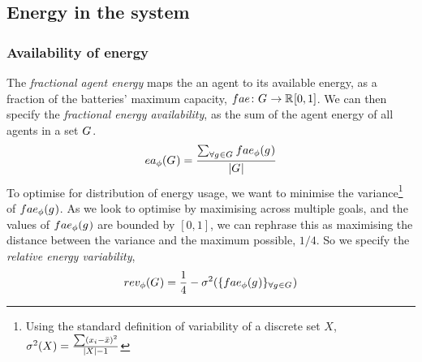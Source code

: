 \newcommand{\formalAgentEnergyAvailable}[2]{
	\functionFormal{fae}
	{\setAgents{}{}}
	{\setRealNumbersUnit{}{}}
}
\newcommand{\functionAgentEnergyAvailable}[2]{
	\functionSignature{fae_{\varTime{}{}}}
	{\varAgent{}{}}
}


\subsection{Energy in the system}
\newcommand{\functionEnergyVariability}[2]{
\ifx \\#1\\
	\functionSignature{rev_{\varTime{}{}}}
	{\setAgents{}{}}
\else
	\functionSignature{rev_{\varTime{}{}}}{#1}
\fi
}
\newcommand{\functionEnergyInverseVariability}[2]{
	\ifx \\#1\\
	\functionSignature{eiv_{\varTime{}{}}}
	{\setAgents{}{}}
	\else
	\functionSignature{eiv_{\varTime{}{}}}{#1}
	\fi
}
\newcommand{\functionEnergyAvailable}[2]{
\ifx \\#1\\
	\functionSignature{ea_{\varTime{}{}}}{\setAgents{}{}}
\else
	\functionSignature{ea_{\varTime{}{}}}{#1}
\fi
}
\subsubsection{Availability of energy}

The \textit{fractional agent energy} maps the an agent to its available energy, as a fraction of the batteries' maximum capacity, $\formalAgentEnergyAvailable{}{}$. We can then specify the \textit{fractional energy availability}, as the sum of the agent energy of all agents in a set $G_{}^{}$.
	\begin{equation}
		\functionEnergyAvailable{}{} 
		= \dfrac{\sum_{\forall \varAgent{}{} \in \setAgents{}{}} \functionAgentEnergyAvailable{\varAgent{i}{}}{}}
		{\funcSize{\setAgents{}{}}}
	\end{equation}
To optimise for distribution of energy usage, we want to minimise the variance\footnote{Using the standard definition of variability of a discrete set $X$, $\sigma^2(X) = \frac{\sum (x_i - \bar{x})^2}{\lvert X \rvert-1}$} of $\functionAgentEnergyAvailable{}{}$. As we look to optimise by maximising across multiple goals, and the values of $\functionAgentEnergyAvailable{}{}$ are bounded by $[0, 1]$, we can rephrase this as maximising the distance between the variance and the maximum possible, $1/4$. So we specify the \textit{relative energy variability},
	\begin{equation}     	
		\functionEnergyVariability{}{} 
		= \frac{1}{4} - \sigma^2(
			\lbrace \functionAgentEnergyAvailable{}{}
			\rbrace_{\forall \varAgent{}{} \in \setAgents{}{}}
		)
	\end{equation}


